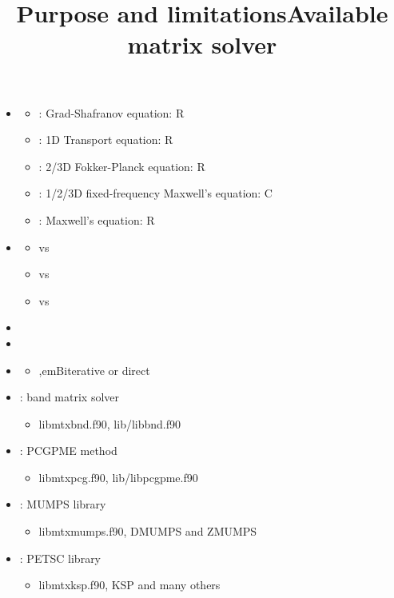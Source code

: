 \documentclass[12pt]{article}
\begin{document}
\title{Purpose and limitations}
\begin{itemize}
\item
  \begin{itemize}
  \item
    : Grad-Shafranov equation: R
  \item
    : 1D Transport equation: R
  \item
    : 2/3D Fokker-Planck equation: R
  \item
    : 1/2/3D fixed-frequency Maxwell's equation: C
  \item
    : Maxwell's equation: R
  \end{itemize}
\item
  \begin{itemize}
  \item
     vs 
  \item
     vs 
  \item
     vs 
  \end{itemize}
\item
\item
\item
  \begin{itemize}
  \item
    ,emB{iterative or direct}
  \end{itemize}
\end{itemize}

\title{Available matrix solver}
\begin{itemize}
\item
  : band matrix solver
  \begin{itemize}
  \item
    libmtxbnd.f90, lib/libbnd.f90
  \end{itemize}
\item
  : PCGPME method
  \begin{itemize}
  \item
    libmtxpcg.f90, lib/libpcgpme.f90
  \end{itemize}
\item
  : MUMPS library
  \begin{itemize}
  \item
    libmtxmumps.f90, DMUMPS and ZMUMPS
  \end{itemize}
\item
  : PETSC library
  \begin{itemize}
  \item
    libmtxksp.f90, KSP and many others
  \end{itemize}
\end{itemize}
\end{document}
